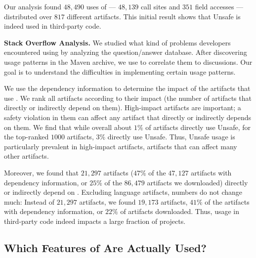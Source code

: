 Our analysis found $48,490$ uses of  --- $48,139$ call sites and $351$ field accesses --- distributed over $817$ different artifacts.
This initial result shows that Unsafe is indeed used in third-party code.

\textbf{Stack Overflow Analysis.}
We studied what kind of problems developers encountered using  by analyzing the \stackoverflow{} question/answer database.
After discovering usage patterns in the Maven archive,
we use \stackoverflow{} to correlate them to discussions.
Our goal is to understand the difficulties in implementing certain \unsafe{} usage patterns.

We use the dependency information to determine the impact of the artifacts that use .
We rank all artifacts according to their impact (the number of artifacts that directly or indirectly depend on them).
High-impact artifacts are important;
a safety violation in them can affect any artifact that directly or indirectly depends on them.
We find that while overall about $1\%$ of artifacts directly use Unsafe,
for the top-ranked $1000$ artifacts, $3\%$ directly use Unsafe.
Thus, Unsafe usage is particularly prevalent in high-impact artifacts, artifacts that can affect many other artifacts.

Moreover, we found that $21,297$ artifacts ($47\%$ of the $47,127$ artifacts with dependency information, or $25\%$ of the $86,479$ artifacts we downloaded) directly or indirectly depend on .
Excluding language artifacts, numbers do not change much:
Instead of $21,297$ artifacts, we found $19,173$ artifacts,
$41\%$ of the artifacts with dependency information, or $22\%$ of artifacts downloaded.
Thus,  usage in third-party code indeed impacts a large fraction of projects.


\subsection*{Which Features of \unsafe{} Are Actually Used?}

